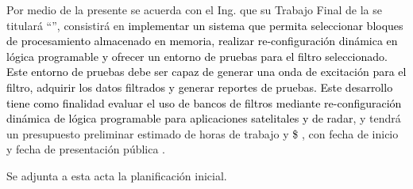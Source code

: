 \documentclass[
11pt, %
]{charter}
\begin{document}
\vspace{2cm}


Por medio de la presente se acuerda con el Ing. \authorname\hspace{1px} que su Trabajo Final de la \degreename\hspace{1px} se titulará ``\ttitle'', consistirá en \textcolor{black}{implementar un sistema que permita seleccionar bloques de procesamiento almacenado en memoria, realizar re-configuración dinámica en lógica programable y ofrecer un entorno de pruebas para el filtro seleccionado. Este entorno de pruebas debe ser capaz de generar una onda de excitación para el filtro, adquirir los datos filtrados y generar reportes de pruebas. Este desarrollo tiene como finalidad evaluar el uso de bancos de filtros mediante re-configuración dinámica de lógica programable para aplicaciones satelitales y de radar}, y tendrá un presupuesto preliminar estimado de \textcolor{black}{\projecteffort} horas de trabajo y \textcolor{black}{\$ \projectcost}, con fecha de inicio \fechaInicioName\hspace{1px} y fecha de presentación pública \fechaFinalName.

Se adjunta a esta acta la planificación inicial.

\vfill
\end{document}
